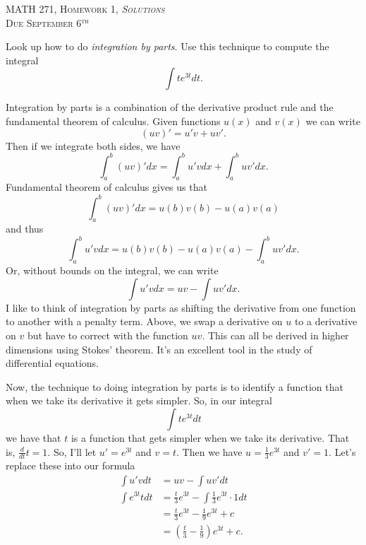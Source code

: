 \documentclass[12pt]{article} %
\begin{document}
\begin{center}
   \textsc{\large MATH 271, Homework 1, \emph{Solutions}}\\
   \textsc{Due September 6$^\textrm{th}$}
\end{center}
\vspace{.5cm}

\begin{problem}
    Look up how to do \emph{integration by parts}. Use this technique to compute the integral
    \[
        \int t e^{3t}dt.
    \]
\end{problem}

\begin{solution}
    Integration by parts is a combination of the derivative product rule and the fundamental theorem of calculus.  Given functions $u(x)$ and $v(x)$ we can write
    \[
    (uv)'=u'v+uv'.
    \]
    Then if we integrate both sides, we have
    \[
    \int_a^b (uv)'dx = \int_a^b u'vdx + \int_a^b uv'dx.
    \]
    Fundamental theorem of calculus gives us that
    \[
    \int_a^b (uv)'dx = u(b)v(b)-u(a)v(a)
    \]
    and thus
    \[
    \int_a^b u'vdx = u(b)v(b)-u(a)v(a)-\int_a^b uv'dx.
    \]
    Or, without bounds on the integral, we can write
    \[
    \int u'vdx = uv - \int uv'dx.
    \]
    I like to think of integration by parts as shifting the derivative from one function to another with a penalty term.  Above, we swap a derivative on $u$ to a derivative on $v$ but have to correct with the function $uv$.  This can all be derived in higher dimensions using Stokes' theorem. It's an excellent tool in the study of differential equations.
    
    Now, the technique to doing integration by parts is to identify a function that when we take its derivative it gets simpler.  So, in our integral
    \[
    \int te^{3t}dt
    \]
    we have that $t$ is a function that gets simpler when we take its derivative. That is, $\frac{d}{dt}t=1$. So, I'll let $u'=e^{3t}$ and $v=t$.  Then we have $u=\frac{1}{3}e^{3t}$ and $v'=1$. Let's replace these into our formula
    \begin{align*}
        \int u'vdt &= uv - \int uv'dt\\
        \int e^{3t}tdt &= \frac{t}{3}e^{3t} - \int \frac{1}{3}e^{3t}\cdot 1 dt\\
        &= \frac{t}{3} e^{3t} - \frac{1}{9}e^{3t}+c\\
        &= \left( \frac{t}{3}-\frac{1}{9}\right)e^{3t}+c.
    \end{align*}
\end{solution}
\newpage
\end{document}
